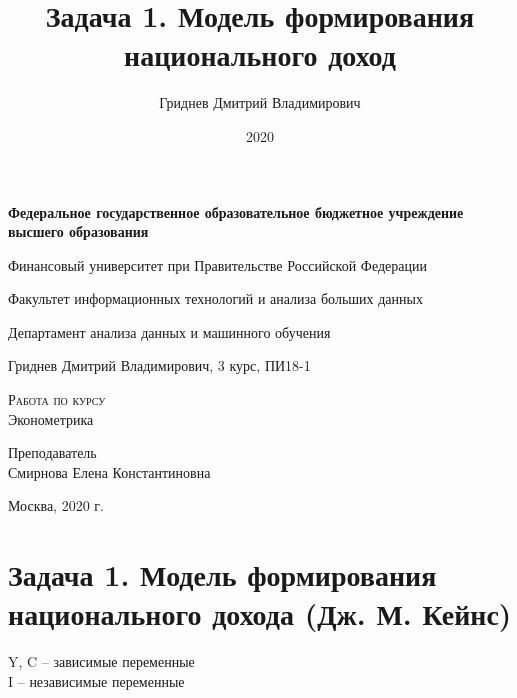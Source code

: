 \documentclass[11pt,a4paper]{article}
\title{Задача 1. Модель формирования национального доход}
\author{Гриднев Дмитрий Владимирович }
\date{2020}
\begin{document}
  \begin{titlepage}
    \begin{center}
      \large

      \textbf{Федеральное государственное образовательное бюджетное учреждение высшего образования}
      \vspace{0.5cm}

      Финансовый университет при Правительстве Российской Федерации
      \vspace{0.25cm}

      Факультет информационных технологий и анализа больших данных

      Департамент анализа данных и машинного обучения
      \vfill

      Гриднев Дмитрий Владимирович, 3 курс, ПИ18-1
      \vfill

      \textsc{Работа по курсу}\\[5mm]

      {\LARGE Эконометрика}
    \bigskip

  \end{center}
  \vfill

  \newlength{\ML}

  \hfill\begin{minipage}{0.6\textwidth}
    Преподаватель\\
    Смирнова Елена Константиновна\\
  \end{minipage}%
  \vfill

    \vspace{2cm}
  \begin{center}
    Москва, 2020 г.
  \end{center}
  \end{titlepage}

  \section{Задача 1. Модель формирования национального дохода (Дж. М. Кейнс)}\label{sec:task1}

  Y, C -- зависимые переменные\\
  I -- независимые переменные\\

  \newline
\end{document}
